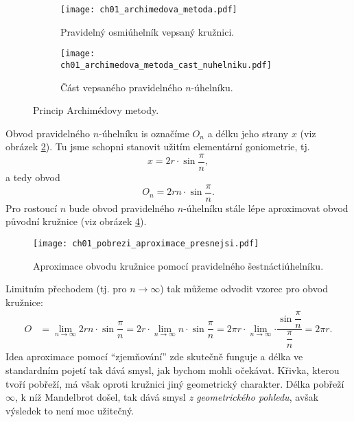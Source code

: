 \begin{figure}[h]
    \centering
    \begin{subfigure}{\subfigwidth}
        \centering
        \texttt{[image: ch01\_archimedova\_metoda.pdf]}
        \caption{Pravidelný osmiúhelník vepsaný kružnici.}
        \label{subfig:archimedova_metoda}
    \end{subfigure}
    \quad
    \begin{subfigure}{\subfigwidth}
        \centering
        \texttt{[image: ch01\_archimedova\_metoda\_cast\_nuhelniku.pdf]}
        \caption{Část vepsaného pravidelného $n$-úhelníku.}
        \label{subfig:archimedova_metoda_cast_nuhelniku}
    \end{subfigure}
    \caption{Princip Archimédovy metody.}
    \label{fig:princip_archimedovy_metody}
\end{figure}
Obvod pravidelného $n$-úhelníku is označíme $O_n$ a délku jeho strany $x$ (viz obrázek \ref{subfig:archimedova_metoda_cast_nuhelniku}). Tu jsme schopni stanovit užitím elementární goniometrie, tj.
\begin{equation*}
    x=2r\cdot\sin{\dfrac{\pi}{n}},
\end{equation*}
a tedy obvod
\begin{equation*}
    O_n=2rn\cdot\sin{\dfrac{\pi}{n}}.
\end{equation*}
Pro rostoucí $n$ bude obvod pravidelného $n$-úhelníku stále lépe aproximovat obvod původní kružnice (viz obrázek \ref{fig:archimedova_metoda_presnejsi}).
\begin{figure}[h]
    \centering
    \texttt{[image: ch01\_pobrezi\_aproximace\_presnejsi.pdf]}
    \caption{Aproximace obvodu kružnice pomocí pravidelného šestnáctiúhelníku.}
    \label{fig:archimedova_metoda_presnejsi}
\end{figure}
Limitním přechodem (tj. pro $n\to\infty$) tak můžeme odvodit vzorec pro obvod kružnice:
\begin{align*}
    O&=\lim_{n\to\infty}{2rn\cdot\sin{\dfrac{\pi}{n}}}=2r\cdot\lim_{n\to\infty}{n\cdot\sin{\dfrac{\pi}{n}}}=2\pi r\cdot\lim_{n\to\infty}{\cdot\dfrac{\sin{\dfrac{\pi}{n}}}{\dfrac{\pi}{n}}}=2\pi r.
\end{align*}
Idea aproximace pomocí ``zjemňování'' zde skutečně funguje a délka ve standardním pojetí tak dává smysl, jak bychom mohli očekávat. Křivka, kterou tvoří pobřeží, má však oproti kružnici jiný geometrický charakter. Délka pobřeží $\infty$, k níž Mandelbrot došel, tak dává smysl \emph{z geometrického pohledu}, avšak výsledek to není moc užitečný.